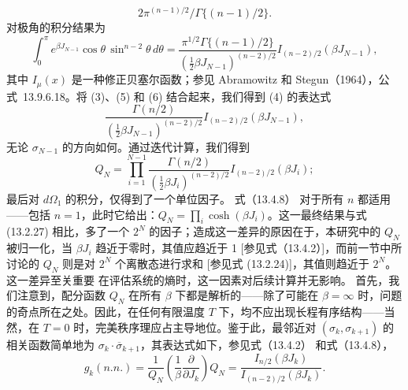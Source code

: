\begin{equation}\tag{13.1.56}\label{eq:13.1.56}
2 \pi ^{( n - 1 ) / 2} / \Gamma \{ ( n - 1 ) / 2 \} .
\end{equation}
对极角的积分结果为
\begin{equation}\tag{13.1.57}\label{eq:13.1.57}
\int _ { 0 } ^{\pi} e ^{\beta J _ { N - 1} } \cos \theta \, \sin ^{n - 2} \theta \, d \theta = \frac { \pi ^{1 / 2} \Gamma \{ ( n - 1 ) / 2 \} } { ( \frac { 1 } { 2 } \beta J _ { N - 1 } ) ^{( n - 2 ) / 2} } I _ { ( n - 2 ) / 2 } ( \beta J _ { N - 1 } ) ,
\end{equation}
其中 \(I_{\mu}(x)\) 是一种修正贝塞尔函数；参见 Abramowitz 和 Stegun（1964），公式~13.9.6.18。将 (3)、(5) 和 (6) 结合起来，我们得到 (4) 的表达式
\begin{equation}\tag{13.1.58}\label{eq:13.1.58}
\frac { \Gamma ( n / 2 ) } { ( \frac { 1 } { 2 } \beta J _ { N - 1 } ) ^{( n - 2 ) / 2} } I _ { ( n - 2 ) / 2 } ( \beta J _ { N - 1 } ) ,
\end{equation}
无论 \(\sigma_{N-1}\) 的方向如何。通过迭代计算，我们得到
\begin{equation}\tag{13.1.59}\label{eq:13.1.59}
Q _ { N } = \prod _ { i = 1 } ^{N - 1} \frac { \Gamma ( n / 2 ) } { ( \frac { 1 } { 2 } \beta J _ { i } ) ^{( n - 2 ) / 2} } I _ { ( n - 2 ) / 2 } ( \beta J _ { i } ) ;
\end{equation}
最后对 \(d\Omega_{1}\) 的积分，仅得到了一个单位因子。
式（13.4.8） 对于所有 \(n\) 都适用——包括 \(n=1\)，此时它给出：\(Q_N=\prod_i\cosh(\beta J_i)\)。这一最终结果与式 (13.2.27) 相比，多了一个 \(2^N\) 的因子；造成这一差异的原因在于，本研究中的 \(Q_N\) 被归一化，当 \(\beta J_i\) 趋近于零时，其值应趋近于 1 {[}参见式（13.4.2）{]}，而前一节中所讨论的 \(Q_N\) 则是对 \(2^N\) 个离散态进行求和 {[}参见式 (13.2.24){]}，其值则趋近于 \(2^N\)。这一差异至关重要
在评估系统的熵时，这一因素对后续计算并无影响。
首先，我们注意到，配分函数 \(Q_{N}\) 在所有 \(\beta\) 下都是解析的——除了可能在 \(\beta=\infty\) 时，问题的奇点所在之处。因此，在任何有限温度 \(T\) 下，均不应出现长程有序结构——当然，在 \(T=0\) 时，完美秩序理应占主导地位。鉴于此，最邻近对 \((\sigma_{k},\sigma_{k+1})\) 的相关函数简单地为 \(\overline{\sigma_{k}\cdot\sigma_{k+1}}\)，其表达式如下，参见式（13.4.2） 和式（13.4.8），
\begin{equation}\tag{13.1.60}\label{eq:13.1.60}
g _ { k } ( n . n . ) = \frac { 1 } { Q _ { N } } \left( \frac { 1 } { \beta } \frac { \partial } { \partial J _ { k } } \right) Q _ { N } = \frac { I _ { n / 2 } ( \beta J _ { k } ) } { I _ { ( n - 2 ) / 2 } ( \beta J _ { k } ) } .
\end{equation}
